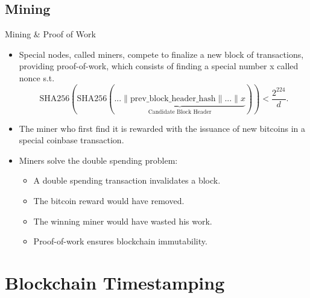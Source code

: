 \documentclass[usenames,dvipsnames]{beamer}
\begin{document}
    \subsection{Mining}
    
    \begin{frame}{Mining \& Proof of Work}
        \begin{itemize}
            \item Special nodes, called \alert{miners}, compete to finalize a new block of transactions, providing \alert{proof-of-work}, which consists of finding a special number \alert{x} called \alert{nonce} s.t.
            $$\text{SHA256}(\text{SHA256}(\underbrace{... \| \text{prev\_block\_header\_hash} \| ... \| x}_{\text{Candidate Block Header}})) < \frac{2^{224}}{d}.$$
            \item The miner who \alert{first} find it is rewarded with the issuance of new bitcoins in a special \alert{coinbase} transaction.
            \item Miners solve the \alert{double spending problem}:
            \begin{itemize}
                \item A double spending transaction invalidates a block.
                \item The bitcoin reward would have removed.
                \item The winning miner would have wasted his work.
                \item Proof-of-work ensures \alert{blockchain immutability}.
            \end{itemize}
        \end{itemize}    
    \end{frame}
    
    \section{Blockchain Timestamping}
\end{document}
